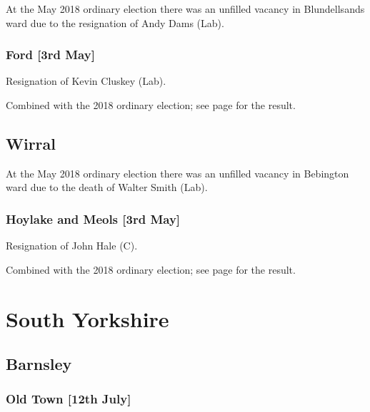 \documentclass[a4paper,openany]{book}
\begin{document}
\begin{resultsiii}
At the May 2018 ordinary election there was an unfilled vacancy in Blundellsands ward due to the resignation of Andy Dams (Lab).

\subsubsection*{Ford \hspace*{\fill}\nolinebreak[1]%
\enspace\hspace*{\fill}
[3rd May]}


Resignation of Kevin Cluskey (Lab).

Combined with the 2018 ordinary election; see page \pageref{FordSefton} for the result.

\subsection*{Wirral}

At the May 2018 ordinary election there was an unfilled vacancy in Bebington ward due to the death of Walter Smith (Lab).

\subsubsection*{Hoylake and Meols \hspace*{\fill}\nolinebreak[1]%
\enspace\hspace*{\fill}
[3rd May]}


Resignation of John Hale (C).

Combined with the 2018 ordinary election; see page \pageref{HoylakeMeolsWirral} for the result.

\section{South Yorkshire}

\subsection*{Barnsley}

\subsubsection*{Old Town \hspace*{\fill}\nolinebreak[1]%
\enspace\hspace*{\fill}
[12th July]}


\end{resultsiii}
\end{document}
